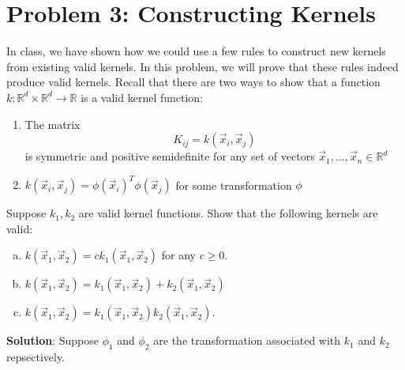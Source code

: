 \documentclass{article}
\begin{document}
	\section*{Problem 3: Constructing Kernels}
	In class, we have shown how we could use a few rules to construct new kernels from existing valid kernels. In this problem, we will prove that these rules indeed produce valid kernels.
	\newline
	Recall that there are two ways to show that a function $k: \mathbb{R}^d \times \mathbb{R}^d \rightarrow \mathbb{R}$ is a valid kernel function:
    \begin{enumerate}
        \item The matrix $$K_{ij} = k(\vec{x}_i, \vec{x}_j)$$ is symmetric and positive semidefinite for any set of vectors $\vec{x}_1, ..., \vec{x}_n \in \mathbb{R}^d$
        \item $k(\vec{x}_i, \vec{x}_j) = \phi(\vec{x}_i)^T \phi(\vec{x}_j)$ for some transformation
        $\phi$
    \end{enumerate}
    Suppose $k_1, k_2$ are valid kernel functions. Show that the following kernels are valid:
	\begin{enumerate}[(a)]
		\item $k(\vec{x}_1, \vec{x}_2) = c k_1(\vec{x}_1, \vec{x}_2)$ for any $c \geq 0$. 
		\item $k(\vec{x}_1, \vec{x}_2) = k_1(\vec{x}_1, \vec{x}_2) + k_2(\vec{x}_1, \vec{x}_2)$ 
		\item $k(\vec{x}_1, \vec{x}_2) = k_1(\vec{x}_1, \vec{x}_2) k_2(\vec{x}_1, \vec{x}_2)$.
    \end{enumerate}
    \textbf{Solution}:
    Suppose $\phi_1$ and $\phi_2$ are the transformation associated with $k_1$ and $k_2$ repsectively.
\end{document}
